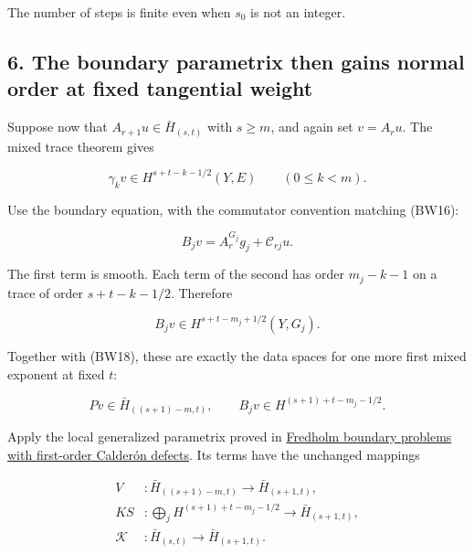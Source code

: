 \documentclass[
  11pt,
]{article}
\makeatletter
\let\ReaderOriginalAnchorStart\hyper@anchorstart
\let\ReaderOriginalAnchorEnd\hyper@anchorend
\let\ReaderPendingAliases\@empty
\def\ReaderArmAliases#1{\gdef\ReaderPendingAliases{#1}}
\def\hyper@anchorstart#1{\ReaderIfNativeAnchorTF{#1}{\ReaderPendingAliases\global\let\ReaderPendingAliases\@empty}{}\ReaderOriginalAnchorStart{#1}}
\makeatother
\begin{document}
The number of steps is finite even when \(s_0\) is not an integer.

\ReaderArmAliases{\ReaderOriginalAnchorStart{AN03-BWF-006}\ReaderOriginalAnchorEnd\begingroup\expandafter\def\csname @currentHref\endcsname{AN03-BWF-006}\label{AN03-BWF-006}\endgroup\ReaderOriginalAnchorStart{6-the-boundary-parametrix-then-gains-normal-order-at-fixed-tangential-weight}\ReaderOriginalAnchorEnd\begingroup\expandafter\def\csname @currentHref\endcsname{6-the-boundary-parametrix-then-gains-normal-order-at-fixed-tangential-weight}\label{6-the-boundary-parametrix-then-gains-normal-order-at-fixed-tangential-weight}\endgroup}
\subsection{6. The boundary parametrix then gains normal order at fixed
tangential
weight}\label{the-boundary-parametrix-then-gains-normal-order-at-fixed-tangential-weight}

Suppose now that \(A_{r+1}u\in\bar H_{(s,t)}\) with \(s\geq m\), and
again set \(v=A_ru\). The mixed trace theorem gives

\[
 \gamma_kv\in H^{s+t-k-1/2}(Y,E)
 \qquad(0\leq k<m).
 \tag{BW22}
\]

Use the boundary equation, with the commutator convention matching
(BW16):

\[
 B_jv=A_r^{G_j}g_j+\mathcal C_{rj}u.
 \tag{BW23}
\]

The first term is smooth. Each term of the second has order \(m_j-k-1\)
on a trace of order \(s+t-k-1/2\). Therefore

\[
 B_jv\in H^{s+t-m_j+1/2}(Y,G_j).
 \tag{BW24}
\]

Together with (BW18), these are exactly the data spaces for one more
first mixed exponent at fixed \(t\):

\[
 Pv\in\bar H_{((s+1)-m,t)},\qquad
 B_jv\in H^{(s+1)+t-m_j-1/2}.
 \tag{BW25}
\]

Apply the local generalized parametrix proved in
\href{generalized-collar-fredholm.pdf}{Fredholm boundary problems with
first-order Calderón defects}. Its terms have the unchanged mappings

\[
 \begin{aligned}
 V&:\bar H_{((s+1)-m,t)}\longrightarrow\bar H_{(s+1,t)},\\
 KS&:\bigoplus_jH^{(s+1)+t-m_j-1/2}
       \longrightarrow\bar H_{(s+1,t)},\\
 \mathscr K&:\bar H_{(s,t)}\longrightarrow\bar H_{(s+1,t)}.
 \end{aligned}
 \tag{BW26}
\]
\end{document}
